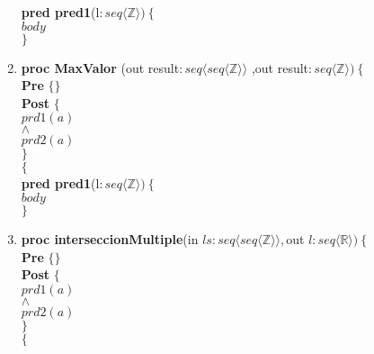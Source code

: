 \documentclass[a4paper]{article}
\begin{document}
\begin{enumerate}[label=\alph*)]
			\textbf{pred pred1}(l$: seq\langle \mathbb{Z}\rangle)\ \{$\smallskip \\
			\hspace*{6mm}$body$\\
			$\}$	
			
		\item
		
			\textbf{proc MaxValor }(out result$:seq\langle seq\langle \mathbb{Z}\rangle \rangle$
				,out result$:seq\langle \mathbb{Z}\rangle )\ \{$\smallskip \\
			\hspace*{6mm} \textbf{Pre }$\{ \}$\smallskip \\
			\hspace*{6mm} \textbf{Post }$\{$\\
			\hspace*{6mm} $prd1(a)$\\
			\hspace*{6mm} $\wedge$\\
			\hspace*{6mm} $prd2(a)$\\
			\hspace*{6mm} $\}$\\
			$\{$\smallskip \\
			
			\textbf{pred pred1}(l$: seq\langle \mathbb{Z}\rangle)\ \{$\smallskip \\
			\hspace*{6mm}$body$\\
			$\}$	
			
		\item
			
			\textbf{proc interseccionMultiple}(in $ls:seq\langle seq\langle \mathbb{Z}\rangle
			 \rangle ,$out $l: seq\langle \mathbb{R}\rangle)\ \{$\smallskip \\
			\hspace*{6mm} \textbf{Pre }$\{ \}$\smallskip \\
			\hspace*{6mm} \textbf{Post }$\{$\\
			\hspace*{6mm} $prd1(a)$\\
			\hspace*{6mm} $\wedge$\\
			\hspace*{6mm} $prd2(a)$\\
			\hspace*{6mm} $\}$\\
			$\{$\smallskip \\
			

\end{enumerate}
\end{document}
